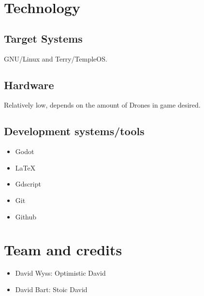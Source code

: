 \documentclass[a4paper]{scrreprt}
\begin{document}
\chapter{Technology}

\section{Target Systems}
GNU/Linux and Terry/TempleOS.

\section{Hardware}
Relatively low, depends on the amount of Drones in game desired.

\section{Development systems/tools}
\begin{itemize}
	\item Godot
	\item \LaTeX
	\item Gdscript
	\item Git
	\item Github 
\end{itemize}


\chapter{Team and credits}

\begin{itemize}
    \item David Wyss: Optimistic David
    \item David Bart: Stoic David
\end{itemize}
\end{document}
